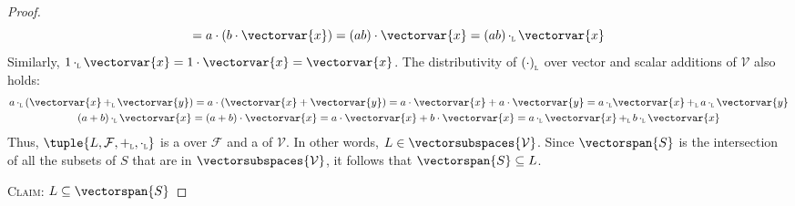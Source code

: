 \begin{proof}
\begin{equation*}
        = a \cdot \mleft( b \cdot \vectorvar{x} \mright)
        = \mleft( ab \mright) \cdot \vectorvar{x}
        = \mleft( ab \mright) \, \smallsubscript{\cdot}{L} \, \vectorvar{x}
    \end{equation*}
    Similarly, \( 1 \, \smallsubscript{\cdot}{L} \, \vectorvar{x} =  1 \cdot \vectorvar{x} = \vectorvar{x} \). The distributivity
    of \( \smallsubscript{(\cdot)}{L} \) over vector and scalar additions of \( \mathcal{V} \) also holds:
    \begin{gather*}
        a \, \smallsubscript{\cdot}{L} \, \mleft( \vectorvar{x} \, \smallsubscript{+}{L} \, \vectorvar{y} \mright)
        = a \cdot \mleft( \vectorvar{x} + \vectorvar{y} \mright)
        = a \cdot \vectorvar{x} + a \cdot \vectorvar{y}
        = a \, \smallsubscript{\cdot}{L} \vectorvar{x} \, \smallsubscript{+}{L} \, a \, \smallsubscript{\cdot}{L} \, \vectorvar{y}\\
        \mleft( a + b \mright) \, \smallsubscript{\cdot}{L} \, \vectorvar{x}
        = \mleft( a + b \mright) \cdot \vectorvar{x}
        = a \cdot \vectorvar{x} + b \cdot \vectorvar{x}
        = a \, \smallsubscript{\cdot}{L} \, \vectorvar{x} \, \smallsubscript{+}{L} \, b \, \smallsubscript{\cdot}{L} \, \vectorvar{x}
    \end{gather*}
    Thus, \( \tuple{L, \mathcal{F}, \smallsubscript{+}{L}, \smallsubscript{\cdot}{L}} \) is a  over \( \mathcal{F} \)
    and a  of \( \mathcal{V} \). In other words, \( L \in \vectorsubspaces{\mathcal{V}} \).
    Since \( \vectorspan{S} \) is the intersection of all the subsets of \( S \) that are in \( \vectorsubspaces{\mathcal{V}} \), it follows that
    \( \vectorspan{S} \subseteq L \).

    \vspace{0.3cm}
    \noindent
    {\scshape Claim:} \( L \subseteq \vectorspan{S} \)


\end{proof}
